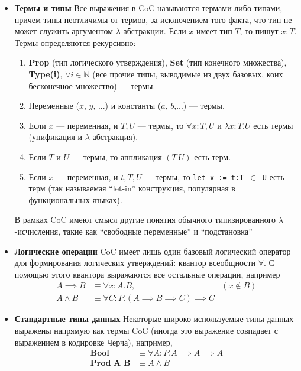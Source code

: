 \begin{itemize}
\item \textbf{Термы и типы} Все выражения в CoC называются термами либо типами, причем типы неотличимы от термов, за исключением того факта, что тип не может служить аргументом $\lambda$-абстракции. Если $x$ имеет тип $T$, то пишут $x:T$. Термы определяются рекурсивно:
\begin{enumerate}
\item \textbf{Prop} (тип логического утверждения), \textbf{Set} (тип конечного множества), \textbf{Type(i)}, $\forall i \in \mathbb{N}$ (все прочие типы, выводимые из двух базовых, коих бесконечное множество) --- термы.
\item Переменные ($x$, $y$, ...) и константы ($a$, $b$,...) --- термы.
\item Если $x$ --- переменная, и $T, U$ --- термы, то $\forall x : T, U$ и $\lambda x : T. U$ есть термы (унификация и $\lambda$-абстракция).
\item Если $T$ и $U$ --- термы, то аппликация $(T\ U)$ есть терм.
\item Если $x$ --- переменная, и $t, T, U$ --- термы, то \texttt{let x := t:T $\in$ U} есть терм (так называемая ``let-in'' конструкция, популярная в функциональных языках).
\end{enumerate}
В рамках CoC имеют смысл другие понятия обычного типизированного $\lambda$-исчисления, такие как ``свободные переменные'' и ``подстановка''

\item \textbf{Логические операции} CoC имеет лишь один базовый логический оператор для формирования логических утверждений: квантор всеобщности $\forall$. С помощью этого квантора выражаются все остальные операции, например
\begin{align*}
A \implies B &\equiv \forall x: A.B, & (x \notin B) \\
A \wedge B &\equiv \forall C : P.(A \implies B \implies C) \implies C &
\end{align*}
\item \textbf{Стандартные типы данных} Некоторые широко используемые типы данных выражены напрямую как термы CoC (иногда это выражение совпадает с выражением в кодировке Черча), например,
\begin{align*}
\textbf{Bool} & \equiv \forall A:P.A \implies A \implies A \\
\textbf{Prod A B} & \equiv A \wedge B
\end{align*}
\end{itemize}

